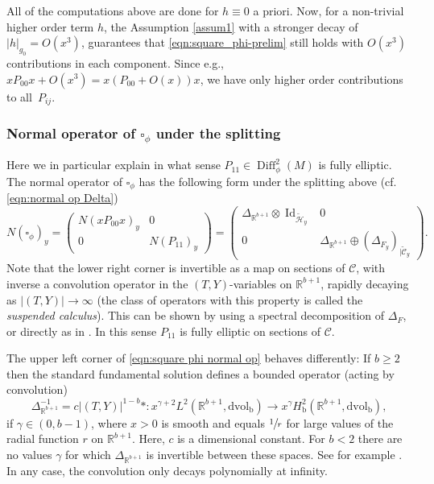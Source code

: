 \documentclass[11pt]{article}
\newcommand{\eg}{e.g.,\xspace}
\newcommand{\cf}{cf.\xspace}
\numberwithin{equation}{section}
\theoremstyle{plain}
\theoremstyle{definition}
\newcommand{\R}{{\mathbb{R}}}
\newcommand{\bb}{{\mathrm{b}}}
\newcommand{\dvol}{\mathrm{dvol}}
\DeclareMathOperator{\Diff}{Diff}
\DeclareMathOperator{\Id}{Id}
\begin{document}
All of the computations above are done for $h\equiv 0$ a priori. Now, for
a non-trivial higher order term $h$, the Assumption \ref{assum1}
with a stronger decay of $|h|_{g_0} = O(x^3)$, guarantees that
\eqref{eqn:square_phi-prelim} still holds with $O(x^3)$ contributions in each
component. Since \eg $xP_{00}x + O(x^3) = x(P_{00}+O(x))x$,
we have only higher order contributions to all~$P_{ij}$.

\subsubsection{Normal operator of $\square_\phi$ under the splitting}
Here we in particular explain in what sense $P_{11}\in \Diff^2_\phi(M)$ is fully
elliptic. The normal operator of $\square_\phi$ has the following form
under the splitting above (\cf \eqref{eqn:normal op Delta})
\begin{equation}
\label{eqn:square phi normal op}
N(\square_\phi)_y =
\begin{pmatrix}
N(xP_{00}x)_y & 0 \\
0 & N(P_{11})_y
\end{pmatrix}
=
\begin{pmatrix}
\Delta_{\R^{b+1}} \otimes \Id_{\widetilde{\mathscr{H}}_y} & 0 \\
0 & \Delta_{\R^{b+1}} \oplus (\Delta_{F_y})_{|\widetilde{\mathscr{C}}_y}
\end{pmatrix}.
\end{equation}
Note that the lower right corner is invertible as a map on sections of $\mathscr{C}$, with inverse a convolution operator in the $(T,Y)$-variables on $\R^{b+1}$, rapidly decaying as \hbox{$|(T,Y)|\!\to\!\infty$} (the class of operators with this property is called the \textit{suspended calculus}). This can be shown by using a spectral decomposition of $\Delta_F$, or directly as in \cite[Prop.\,2.3]{grieser-para}.
In this sense $P_{11}$ is fully elliptic on sections of $\mathscr{C}$.

The upper left corner of \eqref{eqn:square phi normal op} behaves differently:
If $b\geq2$ then the standard fundamental solution defines a bounded operator
(acting by convolution)
\begin{equation}
\label{eqn:inverse Delta}
\Delta_{\R^{b+1}}^{-1} = c|(T,Y)|^{1-b}* : x^{\gamma+2}
L^2(\R^{b+1},\dvol_\bb) \to x^{\gamma} H^2_\bb(\R^{b+1},\dvol_\bb),
\end{equation}
if $\gamma\in(0,b-1)$, where $x>0$ is smooth and equals $\sfrac1r$ for large values of the
radial function $r$ on $\R^{b+1}$. Here, $c$ is a dimensional constant. For $b<2$ there are no values $\gamma$ for
which $\Delta_{\R^{b+1}}$ is invertible between these spaces. See for example
\cite[Prop.\,A.2]{AlbRocShe:RHKTDFC}.
In any case, the convolution only decays polynomially at infinity.
\end{document}
